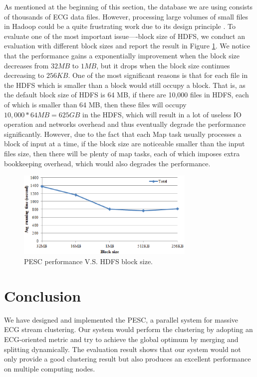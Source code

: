 \documentclass[conference]{IEEEtran}
\begin{document}
As mentioned at the beginning of this section, the database we are using consists of thousands of ECG data files. However, processing large volumes of small files in Hadoop could be a quite frustrating work due to its design principle \cite{white2010hadoop}. To evaluate one of the most important issue----block size of HDFS, we conduct an evaluation with different block sizes and report the result in Figure \ref{fig_block_size}. We notice that the performance gains a exponentially improvement when the block size decreases from $ 32 MB $ to $ 1 MB $, but it drops when the block size continues decreasing to $ 256 KB $. One of the most significant reasons is that for each file in the HDFS which is smaller than a block would still occupy a block. That is, as the default block size of HDFS is 64 MB, if there are 10,000 files in HDFS, each of which is smaller than 64 MB, then these files will occupy $ 10,000 * 64 MB = 625 GB $ in the HDFS, which will result in a lot of useless IO operation and networks overhead and thus eventually degrade the performance significantly. However, due to the fact that each Map task usually processes a block of input at a time, if the block size are noticeable smaller than the input files size, then there will be plenty of map tasks, each of which imposes extra bookkeeping overhead, which would also degrades the performance.
\begin{figure}[!t]
\centering
\includegraphics[height=1.65in]{./Figure/block_size.eps}
\caption{PESC performance V.S. HDFS block size.}
\label{fig_block_size}
\end{figure}



\section{Conclusion}
We have designed and implemented the PESC, a parallel system for massive ECG stream clustering. Our system would perform the clustering by adopting an ECG-oriented metric and try to achieve the global optimum by merging and splitting dynamically. The evaluation result shows that our system would not only provide a good clustering result but also produces an excellent performance on multiple computing nodes.
\end{document}
